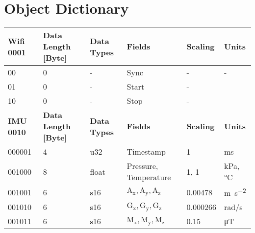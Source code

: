 \section{Object Dictionary}\label{app:OD}

	\begin{sidewaystable}
		\centering
		\begin{tabular}{@{\makebox[3em][r]{\rownumber\space}}|llllll}
			\hline
			\textbf{Wifi 0001}   & \textbf{Data Length [Byte]} & \textbf{Data Types} & \textbf{Fields}             & \textbf{Scaling}   & \textbf{Units}                                    \\
			\hline
			00                   & 0                    & -                   & Sync                        & -                  & -                                                 \\
			01                   & 0                    & -                   & Start                     &      -              &                                                   \\
			10 &         0             &          -           & Stop               &      -              &                                                   \\
			\hline
			\textbf{IMU 0010}    & \textbf{Data Length [Byte]} & \textbf{Data Types} & \textbf{Fields}             & \textbf{Scaling}   & \textbf{Units}                                    \\
			\hline
			000001               & 4                    & u32                 & Timestamp                   & 1                  & ms                                                \\
			001000               & 8                    & float               & Pressure, Temperature       & 1, 1               & kPa, \si{\degreeCelsius}                                         \\
			001001               & 6                    & s16                 & $\mathrm{A_x, A_y, A_z}$                  & 0.00478            & \si{\meter \per \second \squared}               \\
			001010               & 6                    & s16                 & $\mathrm{G_x, G_y, G_z}$                  & 0.000266           & rad/s                                             \\
			001011               & 6                    & s16                 & $\mathrm{M_x, M_y, M_z}$                  & 0.15               & \si{\micro \tesla}                              \\

\end{tabular}
\end{sidewaystable}
